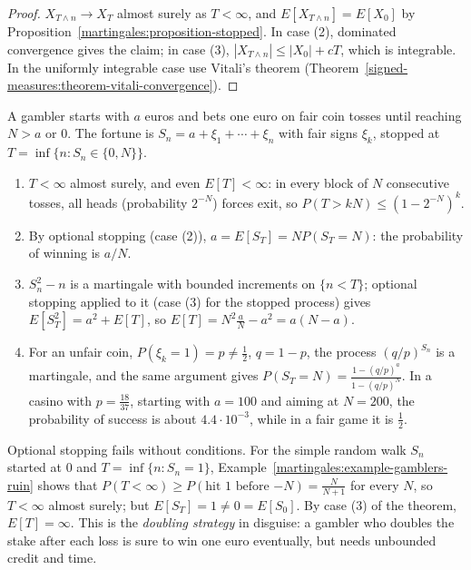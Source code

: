 \begin{proof}
$X_{T \wedge n} \to X_T$ almost surely as $T < \infty$, and $E[X_{T \wedge n}] = E[X_0]$ by Proposition~\ref{martingales:proposition-stopped}. In case (2), dominated convergence gives the claim; in case (3), $|X_{T \wedge n}| \leq |X_0| + cT$, which
is integrable. In the uniformly integrable case use Vitali's theorem (Theorem~\ref{signed-measures:theorem-vitali-convergence}).
\end{proof}

\begin{example}\label{martingales:example-gamblers-ruin}
A gambler starts with $a$ euros and bets one euro on fair coin tosses until reaching $N > a$ or $0$. The fortune is $S_n = a + \xi_1 + \cdots + \xi_n$ with fair signs $\xi_k$, stopped at $T = \inf\{n : S_n \in \{0, N\}\}$.
\begin{enumerate}
\item $T < \infty$ almost surely, and even $E[T] < \infty$: in every block of $N$ consecutive tosses, all heads (probability $2^{-N}$) forces exit, so $P(T > kN) \leq (1 - 2^{-N})^k$.
\item By optional stopping (case (2)), $a = E[S_T] = NP(S_T = N)$: the probability of winning is $a/N$.
\item $S_n^2 - n$ is a martingale with bounded increments on $\{n < T\}$; optional stopping applied to it (case (3) for the stopped process) gives $E[S_T^2] = a^2 + E[T]$, so $E[T] = N^2\frac aN - a^2 = a(N - a)$.
\item For an unfair coin, $P(\xi_k = 1) = p \neq \frac12$, $q = 1 - p$, the process $(q/p)^{S_n}$ is a martingale, and the same argument gives $P(S_T = N) = \frac{1 - (q/p)^a}{1 - (q/p)^N}$. In a casino with $p = \frac{18}{37}$, starting with
$a = 100$ and aiming at $N = 200$, the probability of success is about $4.4 \cdot 10^{-3}$, while in a fair game it is $\frac12$.
\end{enumerate}
\end{example}

\begin{counterexample}\label{martingales:counterexample-optional-stopping}
Optional stopping fails without conditions. For the simple random walk $S_n$ started at $0$ and $T = \inf\{n : S_n = 1\}$, Example~\ref{martingales:example-gamblers-ruin} shows that $P(T < \infty) \geq P(\text{hit } 1 \text{ before } {-N})
= \frac{N}{N + 1}$ for every $N$, so $T < \infty$ almost surely; but $E[S_T] = 1 \neq 0 = E[S_0]$. By case (3) of the theorem, $E[T] = \infty$. This is the \emph{doubling strategy} in disguise: a gambler who doubles the stake after
each loss is sure to win one euro eventually, but needs unbounded credit and time.
\end{counterexample}

